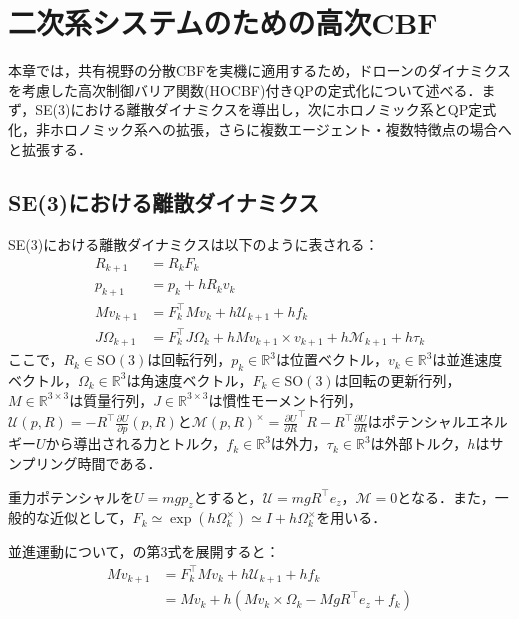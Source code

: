 \section{二次系システムのための高次CBF}

本章では，共有視野の分散CBFを実機に適用するため，ドローンのダイナミクスを考慮した高次制御バリア関数(HOCBF)付きQPの定式化について述べる．まず，SE(3)における離散ダイナミクスを導出し，次にホロノミック系とQP定式化，非ホロノミック系への拡張，さらに複数エージェント・複数特徴点の場合へと拡張する．

\subsection{SE(3)における離散ダイナミクス}

SE(3)における離散ダイナミクスは以下のように表される：
\begin{equation}
\begin{aligned}
R_{k+1} &= R_k F_k \\
p_{k+1} &= p_k + h R_k v_k \\
M v_{k+1} &= F_k^\top M v_k + h \mathcal{U}_{k+1} + h f_k \\
J \Omega_{k+1} &= F_k^\top J \Omega_k + h M v_{k+1} \times v_{k+1} + h \mathcal{M}_{k+1} + h \tau_k
\label{eq:se3_discrete_dynamics}
\end{aligned}
\end{equation}
ここで，$R_k \in \mathrm{SO}(3)$は回転行列，$p_k \in \mathbb{R}^3$は位置ベクトル，$v_k \in \mathbb{R}^3$は並進速度ベクトル，$\Omega_k \in \mathbb{R}^3$は角速度ベクトル，$F_k \in \mathrm{SO}(3)$は回転の更新行列，$M \in \mathbb{R}^{3 \times 3}$は質量行列，$J \in \mathbb{R}^{3 \times 3}$は慣性モーメント行列，$\mathcal{U}(p, R) = -R^\top \frac{\partial U}{\partial p}(p, R)$と$\mathcal{M}(p, R)^\times = \frac{\partial U}{\partial R}^\top R - R^\top \frac{\partial U}{\partial R}$はポテンシャルエネルギー$U$から導出される力とトルク，$f_k \in \mathbb{R}^3$は外力，$\tau_k \in \mathbb{R}^3$は外部トルク，$h$はサンプリング時間である．

重力ポテンシャルを$U = mgp_z$とすると，$\mathcal{U} = mgR^\top e_z$，$\mathcal{M} = 0$となる．また，一般的な近似として，$F_k \simeq \exp(h\Omega_k^\times) \simeq I + h\Omega_k^\times$を用いる．

並進運動について，の第3式を展開すると：
\begin{equation}
\begin{aligned}
M v_{k+1} &= F_k^\top M v_k + h \mathcal{U}_{k+1} + h f_k \\
&= M v_k + h (M v_k \times \Omega_k - M g R^\top e_z + f_k)
\label{eq:translation_dynamics}
\end{aligned}
\end{equation}

